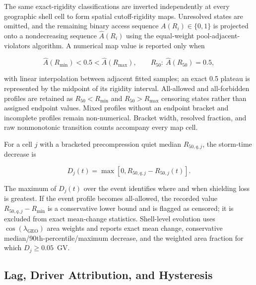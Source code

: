 The same exact-rigidity classifications are inverted independently at every
geographic shell cell to form spatial cutoff-rigidity maps. Unresolved states
are omitted, and the remaining binary access sequence $A(R_i)\in\{0,1\}$ is
projected onto a nondecreasing sequence $\widehat{A}(R_i)$ using the
equal-weight pool-adjacent-violators algorithm. A numerical map value is
reported only when
\begin{linenomath*}
\begin{equation}
 \widehat{A}(R_{\min})<0.5<\widehat{A}(R_{\max}), \qquad
 R_{50}:\ \widehat{A}(R_{50})=0.5,
 \label{eq:exp-spatial-r50}
\end{equation}
\end{linenomath*}
with linear interpolation between adjacent fitted samples; an exact 0.5
plateau is represented by the midpoint of its rigidity interval. All-allowed
and all-forbidden profiles are retained as $R_{50}<R_{\min}$ and
$R_{50}>R_{\max}$ censoring states rather than assigned endpoint values.
Mixed profiles without an endpoint bracket and incomplete profiles remain
non-numerical. Bracket width, resolved fraction, and raw nonmonotonic transition
counts accompany every map cell.

For a cell $j$ with a bracketed precompression quiet median $R_{50,q,j}$, the
storm-time decrease is
\begin{linenomath*}
\begin{equation}
 D_j(t)=\max[0,R_{50,q,j}-R_{50,j}(t)].
 \label{eq:exp-spatial-cutoff-decrease}
\end{equation}
\end{linenomath*}
The maximum of $D_j(t)$ over the event identifies where and when shielding loss
is greatest. If the event profile becomes all-allowed, the recorded value
$R_{50,q,j}-R_{\min}$ is a conservative lower bound and is flagged as censored;
it is excluded from exact mean-change statistics. Shell-level evolution uses
$\cos(\lambda_{\mathrm{GEO}})$ area weights and reports exact mean change,
conservative median/90th-percentile/maximum decrease, and the weighted area
fraction for which $D_j\geq0.05$~GV.

\subsection{Lag, Driver Attribution, and Hysteresis}

